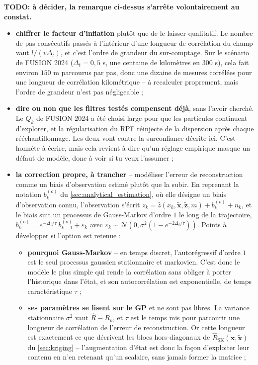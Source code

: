 \textbf{TODO: à décider, la remarque ci-dessus s'arrête volontairement au constat.}
\begin{itemize}
	\item \textbf{chiffrer le facteur d'inflation} plutôt que de le laisser qualitatif. Le nombre de pas consécutifs passés à l'intérieur d'une longueur de corrélation du champ vaut $l/(v\Delta_t)$, et c'est l'ordre de grandeur du sur-comptage. Sur le scénario de FUSION 2024 ($\Delta_t=0,5$ s, une centaine de kilomètres en $300$ s), cela fait environ $150$ m parcourus par pas, donc une dizaine de mesures corrélées pour une longueur de corrélation kilométrique -- à recalculer proprement, mais l'ordre de grandeur n'est pas négligeable ;
	\item \textbf{dire ou non que les filtres testés compensent déjà}, sans l'avoir cherché. Le $Q_k$ de FUSION 2024 a été choisi large pour que les particules continuent d'explorer, et la régularisation du RPF réinjecte de la dispersion après chaque rééchantillonnage. Les deux vont contre la surconfiance décrite ici. C'est honnête à écrire, mais cela revient à dire qu'un réglage empirique masque un défaut de modèle, donc à voir si tu veux l'assumer ;
	\item \textbf{la correction propre, à trancher} -- modéliser l'erreur de reconstruction comme un biais d'observation estimé plutôt que la subir. En reprenant la notation $b_k^{(o)}$ du \cref{sec:analytical_estimation}, où elle désigne un biais d'observation connu, l'observation s'écrit $z_k=\hat{z}(x_k,\tilde{\mathbf{x}},\tilde{\mathbf{z}},m)+b_k^{(o)}+n_k$, et le biais suit un processus de Gauss-Markov d'ordre $1$ le long de la trajectoire, $b_k^{(o)}=e^{-\Delta_t/\tau}\:b_{k-1}^{(o)}+\varepsilon_k$ avec $\varepsilon_k\sim\mathcal{N}\left(0,\sigma^2\left(1-e^{-2\Delta_t/\tau}\right)\right)$. Points à développer si l'option est retenue :
	\begin{itemize}
		\item \textbf{pourquoi Gauss-Markov} -- en temps discret, l'autorégressif d'ordre $1$ est le seul processus gaussien stationnaire et markovien. C'est donc le modèle le plus simple qui rende la corrélation sans obliger à porter l'historique dans l'état, et son autocorrélation est exponentielle, de temps caractéristique $\tau$ ;
		\item \textbf{ses paramètres se lisent sur le GP} et ne sont pas libres. La variance stationnaire $\sigma^2$ vaut $\hat{R}-R_k$, et $\tau$ est le temps mis pour parcourir une longueur de corrélation de l'erreur de reconstruction. Or cette longueur est exactement ce que décrivent les blocs hors-diagonaux de $\hat{R}_{\mathrm{SK}}(\mathbf{x},\tilde{\mathbf{x}})$ du \cref{sec:kriging} -- l'augmentation d'état est donc la façon d'exploiter leur contenu en n'en retenant qu'un scalaire, sans jamais former la matrice ;

\end{itemize}
\end{itemize}
